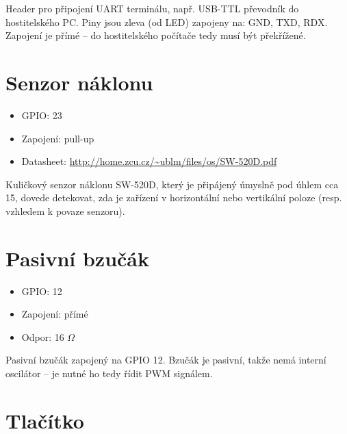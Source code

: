 \documentclass{article}
\newcommand\lang[2]{#1}
\begin{document}
\lang{Header pro připojení UART terminálu, např. USB-TTL převodník do hostitelského PC. Piny jsou zleva (od LED) zapojeny na: GND, TXD, RDX. Zapojení je přímé -- do hostitelského počítače tedy musí být překřížené.}
{Header for UART terminal connection, e.g. the USB-TTL converter to host PC. Pins are connected (from left to right) to: GND, TXD, RXD. The wiring is direct -- wiring should be crossed over to the other end.}

\section{\lang{Senzor náklonu}{Tilt sensor}}

\begin{itemize}
	\item GPIO: 23
	\item \lang{Zapojení}{Wiring}: pull-up
	\item Datasheet: \url{http://home.zcu.cz/~ublm/files/os/SW-520D.pdf}
\end{itemize}

\lang{Kuličkový senzor náklonu SW-520D, který je připájený úmyslně pod úhlem cca 15\degree, dovede detekovat, zda je zařízení v horizontální nebo vertikální poloze (resp. \uv{půl-poloze} vzhledem k povaze senzoru).}
{Ball tilt sensor SW-520D, which is soldered to the expansion board under 15\degree angle. This sensor is able to sense, if the device is in horizontal or vertical position (or \uv{half-position} due to the sensor type).}

\section{\lang{Pasivní bzučák}{Passive buzzer}}

\begin{itemize}
	\item GPIO: 12
	\item \lang{Zapojení: přímé}{Wiring: direct}
	\item \lang{Odpor}{Resistance}: 16 $\Omega$
\end{itemize}

\lang{Pasivní bzučák zapojený na GPIO 12. Bzučák je pasivní, takže nemá interní oscilátor -- je nutné ho tedy řídit PWM signálem.}{Passive buzzer connected to GPIO 12. The buzzer is passive, so it does not have the internal oscilator -- the pulse-width modulation (PWM) is needed to drive the buzzer.}

\section{\lang{Tlačítko}{Push button}}
\end{document}
